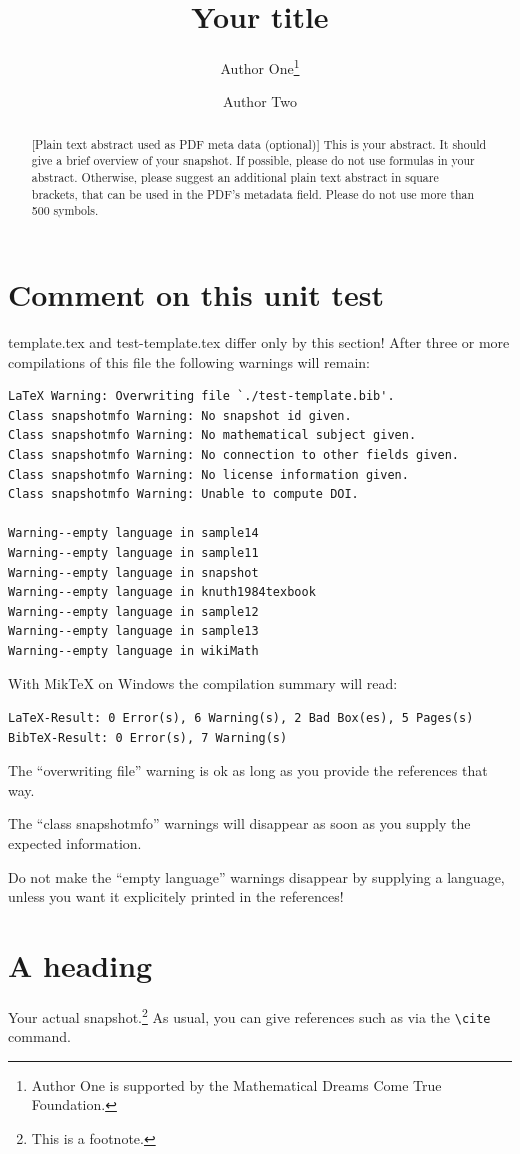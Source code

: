 \documentclass{snapshotmfo}
\author{Author One\thanks{Author One is supported by the Mathematical Dreams Come True Foundation.} \and Author Two}
\title{Your title}
\begin{document}
\begin{abstract}[Plain text abstract used as PDF meta data (optional)]
This is your abstract. It should give a brief overview of your snapshot. If possible, please do not use formulas in your abstract. Otherwise, please suggest an additional plain text abstract in square brackets, that can be used in the PDF's metadata field. Please do not use more than 500 symbols.
\end{abstract}

\section{Comment on this unit test}
template.tex and test-template.tex differ only by this section!
After three or more compilations of this file the following warnings will remain:
\begin{verbatim}
LaTeX Warning: Overwriting file `./test-template.bib'.
Class snapshotmfo Warning: No snapshot id given.
Class snapshotmfo Warning: No mathematical subject given.
Class snapshotmfo Warning: No connection to other fields given.
Class snapshotmfo Warning: No license information given.
Class snapshotmfo Warning: Unable to compute DOI.

Warning--empty language in sample14
Warning--empty language in sample11
Warning--empty language in snapshot
Warning--empty language in knuth1984texbook
Warning--empty language in sample12
Warning--empty language in sample13
Warning--empty language in wikiMath
\end{verbatim}

With MikTeX on Windows the compilation summary will read:
\begin{verbatim}
LaTeX-Result: 0 Error(s), 6 Warning(s), 2 Bad Box(es), 5 Pages(s)
BibTeX-Result: 0 Error(s), 7 Warning(s)
\end{verbatim}

The ``overwriting file'' warning is ok as long as you provide the references that way.

The ``class snapshotmfo'' warnings will disappear as soon as you supply the expected information.

Do not make the ``empty language'' warnings disappear by supplying a language,
unless you want it explicitely printed in the references!


\section{A heading}
Your actual snapshot.\footnote{This is a footnote.} As usual, you can give references such as \cite{snapshot, knuth1984texbook, wikiMath, sample13, sample12, sample11, sample14} via the \verb+\cite+ command.\\
\end{document}
